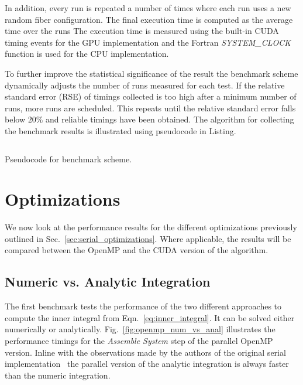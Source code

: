 In addition, every run is repeated a number of times where each run uses a new random fiber configuration. The final execution time is computed as the average time over the runs The execution time is measured using the built-in CUDA timing events for the GPU implementation and the Fortran \emph{SYSTEM\_CLOCK} function is used for the CPU implementation.

To further improve the statistical significance of the result the benchmark scheme dynamically adjusts the number of runs measured for each test. If the relative standard error (RSE) of timings collected is too high after a minimum number of runs, more runs are scheduled. This repeats until the relative standard error falls below $20\%$ and reliable timings have been obtained.  The algorithm for collecting the benchmark results is illustrated using pseudocode in Listing. 

\begin{listing}[!htbp]
  \centering
  \inputminted[mathescape,
    linenos,
    numbersep=5pt,
    fontsize=\footnotesize,
    frame=lines,
    framesep=2mm]{c}{lst/benchmark_scheme.lst}
  \caption{Pseudocode for benchmark scheme.}
  \label{lst:pseudo_benchmark}
\end{listing}

\section{Optimizations}

We now look at the performance results for the different optimizations previously outlined in Sec.~\ref{sec:serial_optimizations}. Where applicable, the results will be compared between the OpenMP and the CUDA version of the algorithm.

\subsection{Numeric vs. Analytic Integration}
\label{subsec:bench_numeric_vs_analytic}

The first benchmark tests the performance of the two different approaches to compute the inner integral from Eqn.~\eqref{eq:inner_integral}. It can be solved either numerically or analytically. Fig.~\ref{fig:openmp_num_vs_anal} illustrates the performance timings for the \emph{Assemble System} step of the parallel OpenMP version. Inline with the observations made by the authors of the original serial implementation~\cite{Tornberg2006} the parallel version of the analytic integration is always faster than the numeric integration.

